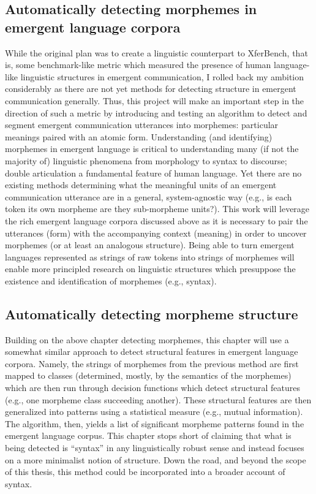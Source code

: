 \subsection{Automatically detecting morphemes in emergent language corpora}
While the original plan was to create a linguistic counterpart to XferBench, that is, some benchmark-like metric which measured the presence of human language-like linguistic structures in emergent communication, I rolled back my ambition considerably as there are not yet methods for detecting structure in emergent communication generally.
Thus, this project will make an important step in the direction of such a metric by introducing and testing an algorithm to detect and segment emergent communication utterances into morphemes: particular meanings paired with an atomic form.
Understanding (and identifying) morphemes in emergent language is critical to understanding many (if not the majority of) linguistic phenomena from morphology to syntax to discourse; double articulation a fundamental feature of human language.
Yet there are no existing methods determining what the meaningful units of an emergent communication utterance are in a general, system-agnostic way (e.g., is each token its own morpheme are they sub-morpheme units?).
This work will leverage the rich emergent language corpora discussed above as it is necessary to pair the utterances (form) with the accompanying context (meaning) in order to uncover morphemes (or at least an analogous structure).
Being able to turn emergent languages represented as strings of raw tokens into strings of morphemes will enable more principled research on linguistic structures which presuppose the existence and identification of morphemes (e.g., syntax).


\subsection{Automatically detecting morpheme structure}
Building on the above chapter detecting morphemes, this chapter will use a somewhat similar approach to detect structural features in emergent language corpora.
Namely, the strings of morphemes from the previous method are first mapped to classes (determined, mostly, by the semantics of the morphemes) which are then run through decision functions which detect structural features (e.g., one morpheme class succeeding another).
These structural features are then generalized into patterns using a statistical measure (e.g., mutual information).
The algorithm, then, yields a list of significant morpheme patterns found in the emergent language corpus.
This chapter stops short of claiming that what is being detected is ``syntax'' in any linguistically robust sense and instead focuses on a more minimalist notion of structure.
Down the road, and beyond the scope of this thesis, this method could be incorporated into a broader account of syntax.



